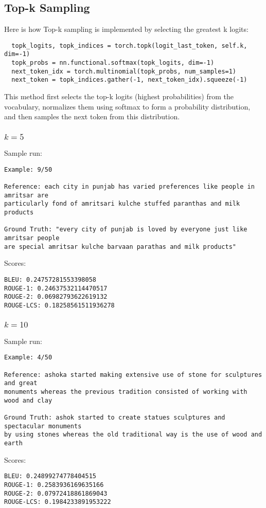 \documentclass[a4paper,12pt]{article}
\begin{document}
\subsection{Top-k Sampling}
Here is how Top-k sampling is implemented by selecting the greatest k logits:
\begin{verbatim}
  topk_logits, topk_indices = torch.topk(logit_last_token, self.k, dim=-1)
  topk_probs = nn.functional.softmax(topk_logits, dim=-1)
  next_token_idx = torch.multinomial(topk_probs, num_samples=1)
  next_token = topk_indices.gather(-1, next_token_idx).squeeze(-1)
\end{verbatim}
This method first selects the top-k logits (highest probabilities) from the vocabulary, 
normalizes them using softmax to form a probability distribution, and then samples the 
next token from this distribution.

\subsubsection{$k = 5$}
Sample run:
\begin{verbatim}
Example: 9/50

Reference: each city in punjab has varied preferences like people in amritsar are 
particularly fond of amritsari kulche stuffed paranthas and milk products

Ground Truth: "every city of punjab is loved by everyone just like amritsar people
are special amritsar kulche barvaan parathas and milk products"

\end{verbatim}
Scores:
\begin{verbatim}
BLEU: 0.24757281553398058
ROUGE-1: 0.24637532114470517
ROUGE-2: 0.06982793622619132
ROUGE-LCS: 0.18258561511936278
\end{verbatim}

\subsubsection{$k = 10$}
Sample run:
\begin{verbatim}
Example: 4/50

Reference: ashoka started making extensive use of stone for sculptures and great 
monuments whereas the previous tradition consisted of working with wood and clay

Ground Truth: ashok started to create statues sculptures and spectacular monuments
by using stones whereas the old traditional way is the use of wood and earth

\end{verbatim}
Scores:
\begin{verbatim}
BLEU: 0.24899274778404515
ROUGE-1: 0.2583936169635166
ROUGE-2: 0.07972418861869043
ROUGE-LCS: 0.1984233891953222
\end{verbatim}
\end{document}
